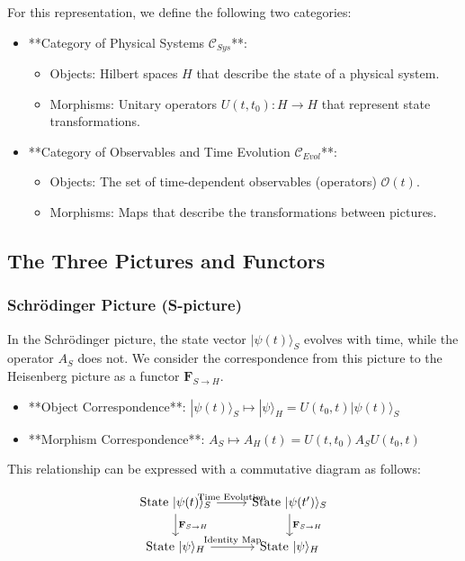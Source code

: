 \documentclass[uplatex,a4j,12pt,dvipdfmx]{jsarticle}
\begin{document}
For this representation, we define the following two categories:

\begin{itemize}
	\item **Category of Physical Systems $\mathcal{C}_{Sys}$**:
	  \begin{itemize}
		  \item Objects: Hilbert spaces $H$ that describe the state of a physical system.
		  \item Morphisms: Unitary operators $U(t, t_0): H \to H$ that represent state transformations.
	  \end{itemize}

	\item **Category of Observables and Time Evolution $\mathcal{C}_{Evol}$**:
	  \begin{itemize}
		  \item Objects: The set of time-dependent observables (operators) $\mathcal{O}(t)$.
		  \item Morphisms: Maps that describe the transformations between pictures.
	  \end{itemize}
\end{itemize}

\subsection{The Three Pictures and Functors}

\subsubsection{Schrödinger Picture (S-picture)}

In the Schrödinger picture, the state vector $|\psi(t)\rangle_S$ evolves with time, while the operator $A_S$ does not. We consider the correspondence from this picture to the Heisenberg picture as a functor $\mathbf{F}_{S \to H}$.

\begin{itemize}
	\item **Object Correspondence**:
	  $|\psi(t)\rangle_S \mapsto |\psi\rangle_H = U(t_0, t)|\psi(t)\rangle_S$
	\item **Morphism Correspondence**:
	  $A_S \mapsto A_H(t) = U(t, t_0)A_S U(t_0, t)$
\end{itemize}

This relationship can be expressed with a commutative diagram as follows:

$$
	\begin{tikzcd}
		\text{State } |\psi(t)\rangle_S \arrow[r, "\text{Time Evolution}"] \arrow[d, "\mathbf{F}_{S \to H}"] & \text{State } |\psi(t')\rangle_S \arrow[d, "\mathbf{F}_{S \to H}"] \\
		\text{State } |\psi\rangle_H \arrow[r, "\text{Identity Map}"] & \text{State } |\psi\rangle_H
	\end{tikzcd}
$$
\end{document}
